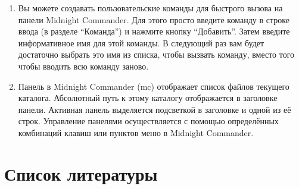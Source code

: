 \documentclass[
  english,
  russian,
  12pt,
  a4paper,
  DIV=11,
  numbers=noendperiod]{scrreprt}
\begin{document}
\begin{enumerate}
  Ctrl-u: Отмена последней операции.\\
  Ins: Вставка/замена.\\
  F7: Поиск (можно использовать регулярные выражения).\\
  Стрелка вверх + F7: Повтор последней операции поиска.\\
  F4: Замена.\\
  F3 (первое нажатие): Начало выделения, (второе нажатие): Окончание
  выделения.\\
  F5: Копировать выделенный фрагмент.\\
  F6: Переместить выделенный фрагмент.\\
  F8: Удалить выделенный фрагмент.\\
  F2: Записать изменения в файл.\\
  F10: Выйти из редактора.
\item
  Вы можете создавать пользовательские команды для быстрого вызова на
  панели Midnight Commander. Для этого просто введите команду в строке
  ввода (в разделе \enquote{Команда}) и нажмите кнопку
  \enquote{Добавить}. Затем введите информативное имя для этой команды.
  В следующий раз вам будет достаточно выбрать это имя из списка, чтобы
  вызвать команду, вместо того чтобы вводить всю команду заново.
\item
  Панель в Midnight Commander (mc) отображает список файлов текущего
  каталога. Абсолютный путь к этому каталогу отображается в заголовке
  панели. Активная панель выделяется подсветкой в заголовке и одной из
  её строк. Управление панелями осуществляется с помощью определённых
  комбинаций клавиш или пунктов меню в Midnight Commander.
\end{enumerate}

\chapter*{Список
литературы}\label{ux441ux43fux438ux441ux43eux43a-ux43bux438ux442ux435ux440ux430ux442ux443ux440ux44b}

\printbibliography[heading=none]
\end{document}
